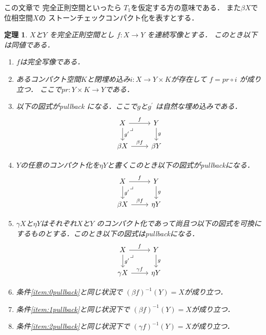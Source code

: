 \documentclass[leqno, a4paper, 12pt, dvipdfmx]{jsarticle}
\newtheorem{thm}{定理}
\begin{document}
この文章で
完全正則空間といったら
$T_{1}$を仮定する方の意味である．
また$\beta X$で位相空間$X$の
ストーンチェックコンパクト化を表すとする．


\begin{thm}\label{thm:main3}
$X$と$Y$
を完全正則空間とし
$f\colon X\to Y$
を連続写像とする．
このとき以下は同値である．

\begin{enumerate}[label=\textup{(Q\arabic*)}]
\item\label{item:0perfect}

$f$は完全写像である．

\item\label{item:comp}
あるコンパクト空間$K$と閉埋め込み$i\colon X\to Y\times K$が存在して
$f=pr\circ i$
が成り立つ．
ここで$pr\colon Y\times K\to Y$である．

\item\label{item:0pullback}
以下の図式がpullback
になる．ここで$g$と$g^{\prime}$
は自然な埋め込みである．
\[
\begin{tikzcd}
X \arrow[r, "f"] \arrow[d, "g^{\prime}"] \arrow[dr, phantom, "\lrcorner", very near start]
& Y\arrow[d,"g"] \\
 \beta X \arrow[r,"\beta f"] & \beta Y
\end{tikzcd}
\]

\item \label{item:1pullback}
$Y$の任意のコンパクト化を$\eta Y$と書くこのとき以下の図式がpullbackになる．
\[
\begin{tikzcd}
X \arrow[r, "f"] \arrow[d, "g^{\prime}"] \arrow[dr, phantom, "\lrcorner", very near start]
& Y\arrow[d,"g"] \\
 \beta X \arrow[r,"\beta f"] & \eta Y
\end{tikzcd}
\]

\item \label{item:2pullback}
$\gamma X$と$\eta Y$はそれぞれ$X$と$Y$
のコンパクト化であって尚且つ以下の図式を可換にするものとする．このとき以下の図式はpullbackになる．
\[
\begin{tikzcd}
X \arrow[r, "f"] \arrow[d, "g^{\prime}"] \arrow[dr, phantom, "\lrcorner", very near start]
& Y\arrow[d,"g"] \\
 \gamma X \arrow[r,"\gamma f"] & \eta Y
\end{tikzcd}
\]

\item\label{item:0jouyo}
条件\ref{item:0pullback}と同じ状況で
$(\beta f)^{-1}(Y)=X$が成り立つ．

\item\label{item:1jouyo}
条件\ref{item:1pullback}と同じ状況下で
$(\beta f)^{-1}(Y)=X$が成り立つ．

\item\label{item:2jouyo}
条件\ref{item:2pullback}と同じ状況下で
$(\gamma f)^{-1}(Y)=X$が成り立つ．


\end{enumerate}
\end{thm}
\end{document}
